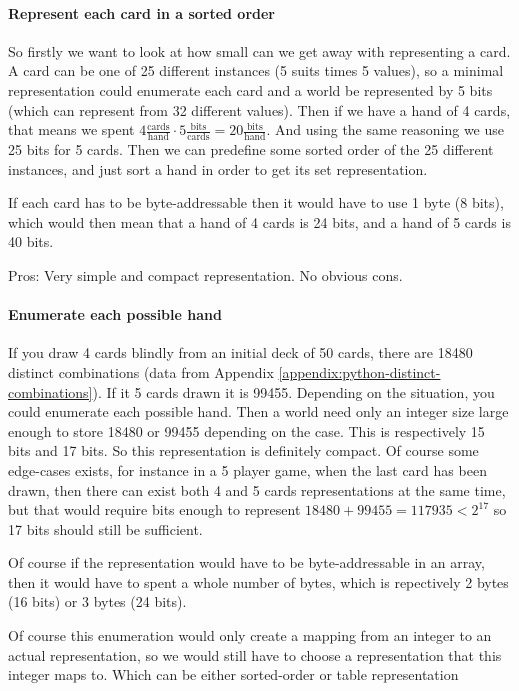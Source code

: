 \paragraph{Represent each card in a sorted order}
So firstly we want to look at how small can we get away with representing a card. A card can be one of 25 different instances (5 suits times 5 values), so a minimal representation could enumerate each card and a world be represented by 5 bits (which can represent from 32 different values).
Then if we have a hand of 4 cards, that means we spent $4 \frac{\text{cards}}{\text{hand}} \cdot 5 \frac{\text{bits}}{\text{cards}} = 20 \frac{\text{bits}}{\text{hand}}$. And using the same reasoning we use 25 bits for 5 cards.
Then we can predefine some sorted order of the 25 different instances, and just sort a hand in order to get its set representation.

If each card has to be byte-addressable then it would have to use 1 byte (8 bits), which would then mean that a hand of 4 cards is 24 bits, and a hand of 5 cards is 40 bits.

Pros: Very simple and compact representation. No obvious cons.

\paragraph{Enumerate each possible hand}
If you draw 4 cards blindly from an initial deck of 50 cards, there are 18480 distinct combinations (data from Appendix \ref{appendix:python-distinct-combinations}). If it 5 cards drawn it is 99455. 
Depending on the situation, you could enumerate each possible hand. Then a world need only an integer size large enough to store 18480 or 99455 depending on the case. This is respectively 15 bits and 17 bits.
So this representation is definitely compact. Of course some edge-cases exists, for instance in a 5 player game, when the last card has been drawn, then there can exist both 4 and 5 cards representations at the same time, but that would require bits enough to represent $18480+99455 = 117935 < 2^{17}$ so 17 bits should still be sufficient.

Of course if the representation would have to be byte-addressable in an array, then it would have to spent a whole number of bytes, which is repectively 2 bytes (16 bits) or 3 bytes (24 bits).

Of course this enumeration would only create a mapping from an integer to an actual representation, so we would still have to choose a representation that this integer maps to. Which can be either sorted-order or table representation

